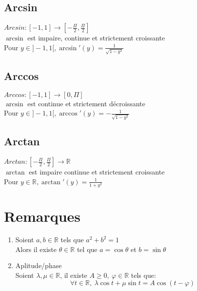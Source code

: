 \documentclass[fleqn]{article}
\theoremstyle{definition} \newtheorem*{defi}{D\'efinition}
\theoremstyle{definition} \newtheorem*{theo}{Th\'eor\`eme}
\theoremstyle{definition} \newtheorem*{prop}{Propri\'et\'e}
\begin{document}
\subsection{Arcsin}
\(Arcsin: [-1,1] \rightarrow [-\frac{\Pi}{2}, \frac{\Pi}{2}]\) \\
\(\arcsin\) est impaire, continue et strictement croissante \\
Pour \(y \in ]-1,1[, \arcsin'(y) = \frac{1}{\sqrt{1-y^2}}\) \\

\subsection{Arccos}
\(Arccos: [-1,1] \rightarrow [0, \Pi]\) \\
\(\arcsin\) est continue et strictement d\'{e}croissante \\
Pour \(y \in ]-1,1[, \arccos'(y) = -\frac{1}{\sqrt{1-y^2}}\) \\

\subsection{Arctan}
\(Arctan: [-\frac{\Pi}{2},\frac{\Pi}{2}] \rightarrow \mathbb{R}\) \\
\(\arctan\) est impaire continue et strictement croissante \\
Pour \(y \in \mathbb{R}, \arctan'(y) = \frac{1}{1+y^2}\) \\

\section{Remarques}
\begin{enumerate}
	\item Soient $a,b \in \mathbb{R}$ tels que $a^2 + b^2 = 1$\\
		Alors il existe $\theta \in \mathbb{R}$ tel que $a = \cos \theta$ et $b = \sin \theta$
	\item Aplitude/phase \\
		Soient $\lambda, \mu \in \mathbb{R}$, il existe $A \geq 0,\ \varphi \in \mathbb{R}$ tels que:
		\[\forall t \in \mathbb{R},\ \lambda \cos t + \mu \sin t = A\cos(t - \varphi)\]
\end{enumerate}
\end{document}
